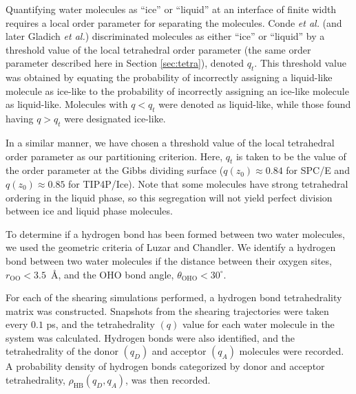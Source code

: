 Quantifying water molecules as ``ice'' or ``liquid'' at an interface
of finite width requires a local order parameter for separating the
molecules.  Conde \textit{et al.}\cite{Conde2008} (and later Gladich
\textit{et al.}\cite{Gladich2011,Gladich2015}) discriminated molecules
as either ``ice'' or ``liquid'' by a threshold value of the local
tetrahedral order parameter (the same order parameter described here
in Section \ref{sec:tetra}), denoted $q_{t}$. This threshold value was
obtained by equating the probability of incorrectly assigning a
liquid-like molecule as ice-like to the probability of incorrectly
assigning an ice-like molecule as liquid-like. Molecules with
$q < q_{t}$ were denoted as liquid-like, while those found having
$q > q_{t}$ were designated ice-like.

In a similar manner, we have chosen a threshold value of the local
tetrahedral order parameter as our partitioning criterion. Here,
$q_{t}$ is taken to be the value of the order parameter at the Gibbs
dividing surface ($q(z_0) \approx 0.84$ for SPC/E and
$q(z_0) \approx 0.85$ for TIP4P/Ice).  Note that some molecules have
strong tetrahedral ordering in the liquid phase, so this segregation
will not yield perfect division between ice and liquid phase
molecules.

To determine if a hydrogen bond has been formed between two water
molecules, we used the geometric criteria of Luzar and
Chandler.\cite{Luzar1996} We identify a hydrogen bond between two
water molecules if the distance between their oxygen sites,
$r_\mathrm{OO} < 3.5$~\AA, and the OHO bond angle,
$\theta_\mathrm{OHO} < 30^\circ$.

For each of the shearing simulations performed, a hydrogen bond
tetrahedrality matrix was constructed.  Snapshots from the shearing
trajectories were taken every $0.1$ ps, and the tetrahedrality $(q)$
value for each water molecule in the system was calculated. Hydrogen
bonds were also identified, and the tetrahedrality of the donor
$(q_{D})$ and acceptor $(q_{A})$ molecules were recorded. A
probability density of hydrogen bonds categorized by donor and
acceptor tetrahedrality, $\rho_\mathrm{HB}(q_D, q_A)$, was then
recorded.

